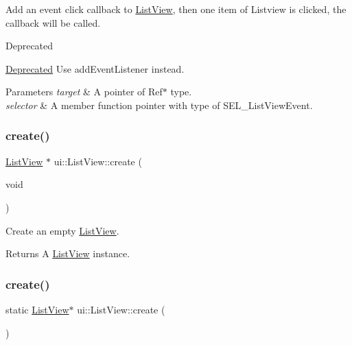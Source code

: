 Add an event click callback to \hyperlink{classui_1_1ListView}{List\+View}, then one item of Listview is clicked, the callback will be called. \begin{DoxyRefDesc}{Deprecated}
\item[\hyperlink{deprecated__deprecated000380}{Deprecated}]Use {\ttfamily add\+Event\+Listener} instead. \end{DoxyRefDesc}

\begin{DoxyParams}{Parameters}
{\em target} & A pointer of {\ttfamily Ref$\ast$} type. \\
\hline
{\em selector} & A member function pointer with type of {\ttfamily S\+E\+L\+\_\+\+List\+View\+Event}. \\
\hline
\end{DoxyParams}
\mbox{\label{classui_1_1ListView_a5dc4e7e3fe7c954a4b07ea53bd40ca97}} 
\subsubsection{\texorpdfstring{create()}{create()}\hspace{0.1cm}{\footnotesize\ttfamily [1/2]}}
{\footnotesize\ttfamily \hyperlink{classui_1_1ListView}{List\+View} $\ast$ ui\+::\+List\+View\+::create (\begin{DoxyParamCaption}\item[{void}]{ }\end{DoxyParamCaption})\hspace{0.3cm}{\ttfamily [static]}}

Create an empty \hyperlink{classui_1_1ListView}{List\+View}. \begin{DoxyReturn}{Returns}
A \hyperlink{classui_1_1ListView}{List\+View} instance. 
\end{DoxyReturn}
\mbox{\label{classui_1_1ListView_a31ae9f031409d417a2079fc73d220703}} 
\subsubsection{\texorpdfstring{create()}{create()}\hspace{0.1cm}{\footnotesize\ttfamily [2/2]}}
{\footnotesize\ttfamily static \hyperlink{classui_1_1ListView}{List\+View}$\ast$ ui\+::\+List\+View\+::create (\begin{DoxyParamCaption}{ }\end{DoxyParamCaption})\hspace{0.3cm}{\ttfamily [static]}}

